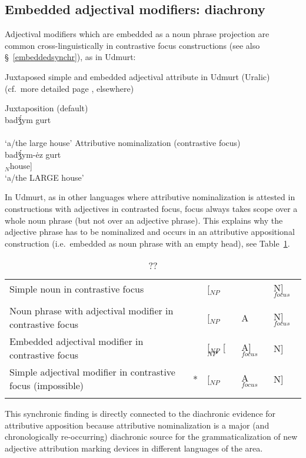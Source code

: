 
\subsection{Embedded adjectival modifiers: diachrony}\label{embeddeddiachr}
Adjectival modifiers which are embedded as a noun phrase projection are common cross-linguistically in contrastive focus constructions (see also \S~\ref{embeddedsynchr}), as in Udmurt:
\begin{exe}
\ex \rm{Juxtaposed simple and embedded adjectival attribute in Udmurt (Uralic)}\\(cf.~more detailed page \pageref{udmurt synchr}, elsewhere)
\begin{xlist}
\ex	\rm{Juxtaposition (default)}\\
\gll	{}		badǯ́ym gurt\\
	[$_{NP}$ $_{A}$big $_{N}$house]\\
\glt	‘a/the large house’
\ex	\rm{Attributive nominalization (contrastive focus)}\\
\gll	{}		{}			badǯ́ym-ėz gurt\\
	[$_{NP}$ [$_{NP'}$ $_{A}$big-\textsc{nmlz}] $_{N}$house]\\
\glt	‘a/the LARGE house’
\end{xlist}
\end{exe}
In Udmurt, as in other languages where attributive nominalization is attested in constructions with adjectives in contrasted focus, focus always takes scope over a whole noun phrase (but not over an adjective phrase). This explains why the adjective phrase has to be nominalized and occurs in an attributive appositional construction (i.e.~embedded as noun phrase with an empty head), see Table~\ref{udm-nom}.
\begin{table}
\begin{tabularx}{\textwidth}{X r l l l}
\lsptoprule
Simple noun in contrastive focus					&	&[$_{NP}$ 		&			&N]$_{focus}$\\
\\
\midrule
Noun phrase with adjectival modifier in contrastive focus	&	&[$_{NP}$ 		&A 			&N]$_{focus}$\\
\midrule
Embedded adjectival modifier in contrastive focus		&	&[$_{NP}$ [$_{NP'}$ &A]$_{focus}$ 	&N]\\
\midrule
Simple adjectival modifier in contrastive focus (impossible)&{*}	&[$_{NP}$ 		&A$_{focus}$ 	&N]\\
\lspbottomrule
\end{tabularx}
\caption[??]{??}\label{udm-nom}
\end{table}
This synchronic finding is directly connected to the diachronic evidence for attributive apposition because attributive nominalization is a major (and chronologically re-occurring) diachronic source for the grammaticalization of new adjective attribution marking devices in different languages of the area.

